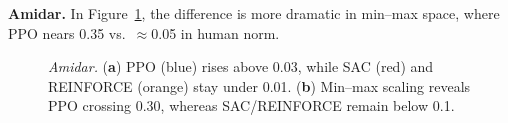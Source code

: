 \noindent \textbf{Amidar.} In Figure~\ref{fig:amidar_combined}, the difference is more dramatic in min--max space, where PPO nears 0.35 vs.\ $\approx$\num{0.05} in human norm.
\begin{figure} 
	\centering
	\quad
	\caption{\emph{Amidar.}
		(\textbf{a}) PPO (blue) rises above 0.03, while SAC (red) and REINFORCE (orange) stay under 0.01. 
		(\textbf{b}) Min--max scaling reveals PPO crossing 0.30, whereas SAC/REINFORCE remain below 0.1.}
	\label{fig:amidar_combined}
\end{figure}

\medskip

